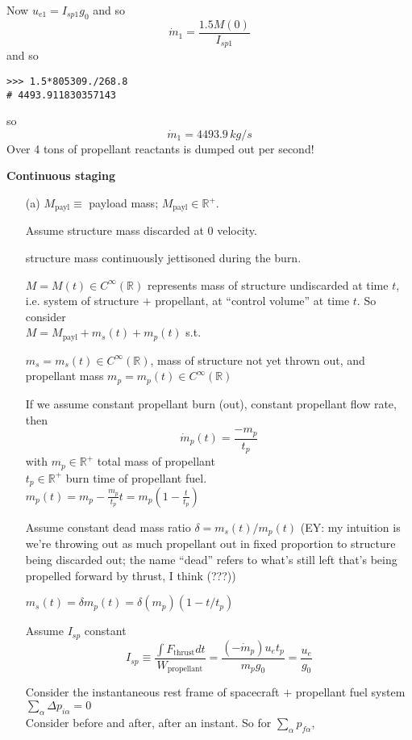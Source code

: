 \documentclass[10pt]{amsart}
\newcommand{\problemhead}[1]
  {
   \noindent{\small\bf Problem #1.}
   }
\begin{document}
\begin{multicols*}{2}
\begin{enumerate}
Now $u_{e1} = I_{sp1} g_0$ and so
\[
\dot{m}_1 = \frac{1.5 M(0)}{I_{sp1}}
\]
and so
\begin{lstlisting}
>>> 1.5*805309./268.8
# 4493.911830357143
\end{lstlisting}
\end{enumerate}
so
\[
\boxed{ \dot{m}_1 = 4493.9 \, kg/s }
\]
Over 4 tons of propellant reactants is dumped out per second!

\problemhead{2} \textbf{Continuous staging}
\begin{enumerate}
\item[(a)]
$M_{\text{payl}} \equiv $ payload mass; $M_{\text{payl}} \in \mathbb{R}^+$. 

Assume structure mass discarded at $0$ velocity.  

structure mass continuously jettisoned during the burn.  

$M=M(t) \in C^{\infty}(\mathbb{R})$ represents mass of structure undiscarded at time $t$, i.e. system of structure $+$ propellant, at ``control volume'' at time $t$.  So consider \\
$ M = M_{\text{payl}} + m_s(t) + m_p(t)$ s.t. 

$m_s = m_s(t) \in C^{\infty}(\mathbb{R})$, mass of structure not yet thrown out, and propellant mass $m_p = m_p(t) \in C^{\infty}(\mathbb{R})$

If we assume constant propellant burn (out), constant propellant flow rate, then
\[
\dot{m}_p(t) = \frac{-m_p }{t_p}
\]
with 
$m_p \in \mathbb{R}^+$ total mass of propellant \\
$t_p \in \mathbb{R}^+$ burn time of propellant fuel. \\

$m_p(t) = m_p - \frac{m_p}{t_p} t = m_p (1 - \frac{t}{t_p})$

Assume constant dead mass ratio $\delta = m_s(t)/m_p(t)$ (EY: my intuition is we're throwing out as much propellant out in fixed proportion to structure being discarded out; the name ``dead'' refers to what's still left that's being propelled forward by thrust, I think (???))

$m_s(t) = \delta m_p(t) = \delta (m_p) (1- t/t_p)$

Assume $I_{sp}$ constant
\[
I_{sp} \equiv \frac{ \int F_{\text{thrust}} dt }{ W_{\text{propellant}} } = \frac{ (-\dot{m}_p )u_e t_p }{ m_p g_0 } = \frac{u_e}{g_0}
\]

Consider the instantaneous rest frame of spacecraft $+$ propellant fuel system $\sum_{\alpha} \Delta p_{i\alpha } = 0 $\\
Consider before and after, after an instant.  So for $\sum_{\alpha} p _{f\alpha}$,


\end{enumerate}
\end{multicols*}
\end{document}
